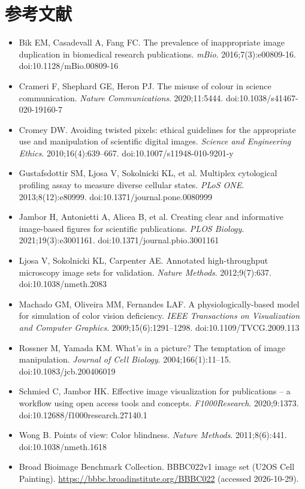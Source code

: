 \section*{参考文献}

\begin{itemize}
\item Bik EM, Casadevall A, Fang FC. The prevalence of inappropriate image duplication in biomedical research publications. \textit{mBio}. 2016;7(3):e00809-16. doi:10.1128/mBio.00809-16
\item Crameri F, Shephard GE, Heron PJ. The misuse of colour in science communication. \textit{Nature Communications}. 2020;11:5444. doi:10.1038/s41467-020-19160-7
\item Cromey DW. Avoiding twisted pixels: ethical guidelines for the appropriate use and manipulation of scientific digital images. \textit{Science and Engineering Ethics}. 2010;16(4):639--667. doi:10.1007/s11948-010-9201-y
\item Gustafsdottir SM, Ljosa V, Sokolnicki KL, et al. Multiplex cytological profiling assay to measure diverse cellular states. \textit{PLoS ONE}. 2013;8(12):e80999. doi:10.1371/journal.pone.0080999
\item Jambor H, Antonietti A, Alicea B, et al. Creating clear and informative image-based figures for scientific publications. \textit{PLOS Biology}. 2021;19(3):e3001161. doi:10.1371/journal.pbio.3001161
\item Ljosa V, Sokolnicki KL, Carpenter AE. Annotated high-throughput microscopy image sets for validation. \textit{Nature Methods}. 2012;9(7):637. doi:10.1038/nmeth.2083
\item Machado GM, Oliveira MM, Fernandes LAF. A physiologically-based model for simulation of color vision deficiency. \textit{IEEE Transactions on Visualization and Computer Graphics}. 2009;15(6):1291--1298. doi:10.1109/TVCG.2009.113
\item Rossner M, Yamada KM. What's in a picture? The temptation of image manipulation. \textit{Journal of Cell Biology}. 2004;166(1):11--15. doi:10.1083/jcb.200406019
\item Schmied C, Jambor HK. Effective image visualization for publications -- a workflow using open access tools and concepts. \textit{F1000Research}. 2020;9:1373. doi:10.12688/f1000research.27140.1
\item Wong B. Points of view: Color blindness. \textit{Nature Methods}. 2011;8(6):441. doi:10.1038/nmeth.1618
\item Broad Bioimage Benchmark Collection. BBBC022v1 image set (U2OS Cell Painting). \url{https://bbbc.broadinstitute.org/BBBC022} (accessed 2026-10-29).

\end{itemize}
